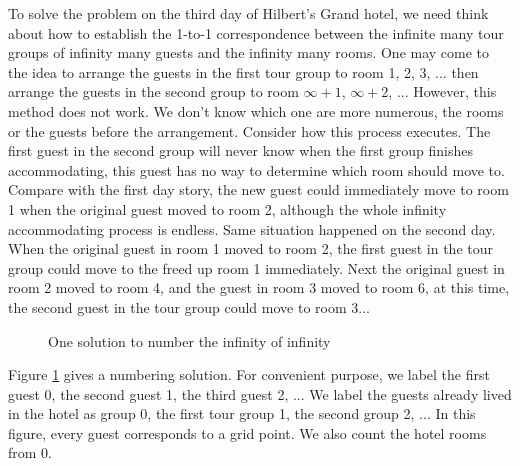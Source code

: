 \documentclass{article}
\begin{document}
To solve the problem on the third day of Hilbert's Grand hotel, we need think about how to establish the 1-to-1 correspondence between the infinite many tour groups of infinity many guests and the infinity many rooms. One may come to the idea to arrange the guests in the first tour group to room 1, 2, 3, ... then arrange the guests in the second group to room $\infty + 1$, $\infty + 2$, ... However, this method does not work. We don't know which one are more numerous, the rooms or the guests before the arrangement. Consider how this process executes. The first guest in the second group will never know when the first group finishes accommodating, this guest has no way to determine which room should move to. Compare with the first day story, the new guest could immediately move to room 1 when the original guest moved to room 2, although the whole infinity accommodating process is endless. Same situation happened on the second day. When the original guest in room 1 moved to room 2, the first guest in the tour group could move to the freed up room 1 immediately. Next the original guest in room 2 moved to room 4, and the guest in room 3 moved to room 6, at this time, the second guest in the tour group could move to room 3...

\begin{figure}[htbp]
\centering
{}
\caption{One solution to number the infinity of infinity}
\label{fig:NNtoN}
\end{figure}

Figure \ref{fig:NNtoN} gives a numbering solution. For convenient purpose, we label the first guest 0, the second guest 1, the third guest 2, ... We label the guests already lived in the hotel as group 0, the first tour group 1, the second group 2, ... In this figure, every guest corresponds to a grid point. We also count the hotel rooms from 0.
\end{document}

